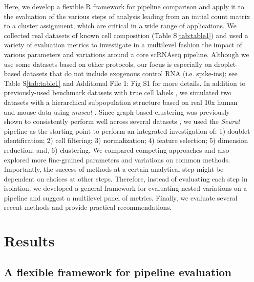 \documentclass{bmcart}
\begin{document}
Here, we develop a flexible R framework for pipeline comparison and apply it to the evaluation of the various steps of analysis leading from an initial count matrix to a cluster assignment, which are critical in a wide range of applications. We collected real datasets of known cell composition ({\color{red}Table S\ref{tab:table1}}) and used a variety of evaluation metrics to investigate in a multilevel fashion the impact of various parameters and variations around a core scRNAseq pipeline. Although we use some datasets based on other protocols, our focus is especially on droplet-based datasets that do not include exogenous control RNA (i.e. spike-ins); see {\color{red}Table S\ref{tab:table1}} and Additional File 1: Fig S1 for more details. In addition to previously-used benchmark datasets with true cell labels \cite{duoClustering2018,tianMixology2018}, we simulated two datasets with a hierarchical subpopulation structure based on real 10x human and mouse data using \textit{muscat} \cite{CrowellMuscat2019}. 
Since graph-based clustering \cite{satijaSeurat2015} was previously shown to consistently perform well across several datasets \cite{duoClustering2018,tianMixology2018}, we used the \textit{Seurat} pipeline as the starting point to perform an integrated investigation of: 1) doublet identification; 2) cell filtering; 3) normalization; 4) feature selection; 5) dimension reduction; and, 6) clustering. We compared competing approaches and also explored more fine-grained parameters and variations on common methods. Importantly, the success of methods at a certain analytical step might be dependent on choices at other steps. Therefore, instead of evaluating each step in isolation, we developed a general framework for evaluating nested variations on a pipeline and suggest a multilevel panel of metrics. Finally, we evaluate several recent methods and provide practical recommendations.

\section*{Results}

\subsection*{A flexible framework for pipeline evaluation}
\end{document}
